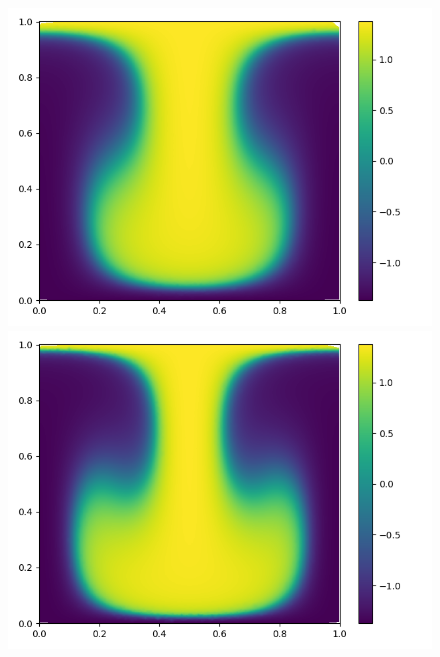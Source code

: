 \documentclass[a4paper, 14pt]{extarticle}
\begin{document}
		\begin{figure}[H]
			\begin{minipage}{0.5\textwidth}
				\centering
				\includegraphics[width = \linewidth]{5.png}
			\end{minipage}\hfill
			\begin{minipage}{0.5\textwidth}
				\centering
				\includegraphics[width = \linewidth]{6.png}
			\end{minipage}\hfill
		\end{figure}
	
\end{document}
